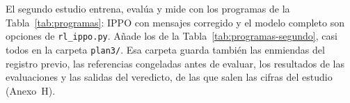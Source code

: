 
El segundo estudio entrena, evalúa y mide con los programas de la
Tabla~\ref{tab:programas}: IPPO con mensajes corregido y el modelo
completo son opciones de \texttt{rl\_ippo.py}. Añade los de la
Tabla~\ref{tab:programas-segundo}, casi todos en la carpeta
\texttt{plan3/}. Esa carpeta guarda también las enmiendas del registro
previo, las referencias congeladas antes de evaluar, los resultados de
las evaluaciones y las salidas del veredicto, de las que salen las
cifras del estudio (Anexo~H).

